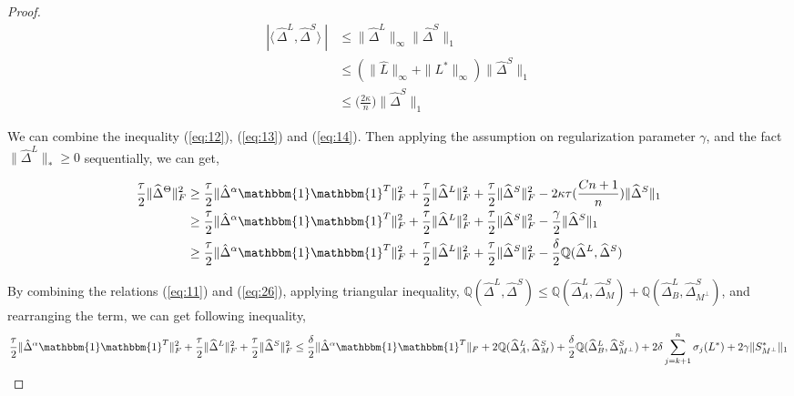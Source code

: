 \documentclass[AMS,STIX1COL]{WileyNJD-v2}
\begin{document}
\begin{proof}
\begin{align}
    | \langle\, \widehat\Delta^{L}, \widehat\Delta^{S} \rangle\ | \nonumber
    &\leq \|\widehat{\Delta}^{L}\|_{\infty} \|\widehat{\Delta}^{S}\|_1\\ \nonumber
    &\leq (\|\widehat{L}\|_{\infty} + \|L^{*}\|_{\infty})
    \|\widehat{\Delta}^{S} \|_{1}\\
    &\leq \big(\frac{2\kappa}{n}\big)\|\widehat{\Delta}^{S} \|_{1} \label{eq:14}
\end{align}

We can combine the inequality (\ref{eq:12}), (\ref{eq:13}) and (\ref{eq:14}). Then applying the assumption on regularization parameter $\gamma$, and the fact $\|\widehat{\Delta}^{L}\|_{\ast}\geq0$ sequentially, we can get,  

\begin{align}
    \frac{\tau}{2}\|\widehat{\Delta}^{\Theta}\|_{F}^{2}  \nonumber
    &\geq \frac{\tau}{2} \|\hat{\Delta}^{\alpha}\mathbbm{1}\mathbbm{1}^T\|_{F}^{2} + \frac{\tau}{2} \|\widehat{\Delta}^{L}\|_{F}^{2} + \frac{\tau}{2} \|\widehat{\Delta}^{S}\|_{F}^{2} 
    - 2\kappa\tau(\frac{Cn+1}{n})\|\widehat{\Delta}^{S}\|_{1} \\ \nonumber
    &\geq \frac{\tau}{2} \|\hat{\Delta}^{\alpha}\mathbbm{1}\mathbbm{1}^T\|_{F}^{2} + \frac{\tau}{2} \|\widehat{\Delta}^{L}\|_{F}^{2} + \frac{\tau}{2} \|\widehat{\Delta}^{S}\|_{F}^{2} - \frac{\gamma}{2}\|\widehat{\Delta}^{S}\|_{1}\\
    &\geq \frac{\tau}{2} \|\hat{\Delta}^{\alpha}\mathbbm{1}\mathbbm{1}^T\|_{F}^{2} + \frac{\tau}{2} \|\widehat{\Delta}^{L}\|_{F}^{2} + \frac{\tau}{2} \|\widehat{\Delta}^{S}\|_{F}^{2} - \frac{\delta}{2} \mathbb{Q}(\widehat{\Delta}^L,\widehat{\Delta}^S) \label{eq:26}
\end{align}

By combining the relations (\ref{eq:11}) and (\ref{eq:26}), applying triangular inequality, $\mathbb{Q}(\widehat{\Delta}^L,\widehat{\Delta}^S)\leq \mathbb{Q}(\widehat{\Delta}^L_{A},\widehat{\Delta}^S_{M}) + \mathbb{Q}(\widehat{\Delta}^L_{B},\widehat{\Delta}^S_{M^{\perp}})$, and rearranging the term, we can get following inequality, 
\[
    \frac{\tau}{2} \|\hat{\Delta}^{\alpha}\mathbbm{1}\mathbbm{1}^T\|_{F}^{2} + \frac{\tau}{2} \|\widehat{\Delta}^{L}\|_{F}^{2} + \frac{\tau}{2} \|\widehat{\Delta}^{S}\|_{F}^{2} \\
    \leq \frac{\delta}{2} \|\hat{\Delta}^{\alpha}\mathbbm{1}\mathbbm{1}^T\|_{F} + 
    2\mathbb{Q}(\widehat{\Delta}^L_{A},\widehat{\Delta}^S_{M}) +  \frac{\delta}{2} \mathbb{Q}(\widehat{\Delta}^L_{B},\widehat{\Delta}^S_{M^\perp}) + 
    2 \delta \sum_{j=k+1}^{n} \sigma_{j}(L^{*}) + 2\gamma   
    \|S^{*}_{M^\perp}\|_{1}
\]


\end{proof}
\end{document}
